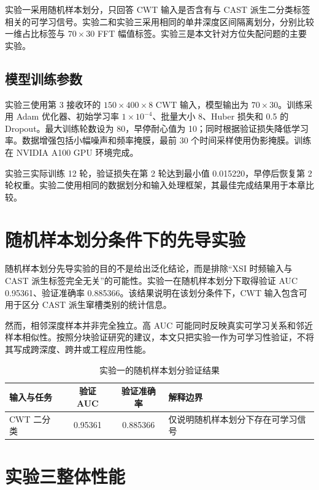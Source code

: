 实验一采用随机样本划分，只回答 CWT 输入是否含有与 CAST 派生二分类标签相关的可学习信号。实验二和实验三采用相同的单井深度区间隔离划分，分别比较一维占比标签与 $70\times30$ FFT 幅值标签。实验三是本文针对方位失配问题的主要实验。

\subsection{模型训练参数}

实验三使用第 3 接收环的 $150\times400\times8$ CWT 输入，模型输出为 $70\times30$。训练采用 Adam 优化器、初始学习率 $1\times10^{-4}$、批量大小 8、Huber 损失和 0.5 的 Dropout。最大训练轮数设为 80，早停耐心值为 10；同时根据验证损失降低学习率。数据增强包括小幅噪声和频率掩膜，最前 30 个时间采样使用伪影掩膜。训练在 NVIDIA A100 GPU 环境完成。

实验三实际训练 12 轮，验证损失在第 2 轮达到最小值 0.015220，早停后恢复第 2 轮权重。实验二使用相同的数据划分和输入处理框架，其最佳完成结果用于本章比较。

\section{随机样本划分条件下的先导实验}

随机样本划分先导实验的目的不是给出泛化结论，而是排除“XSI 时频输入与 CAST 派生标签完全无关”的可能性。实验一在随机样本划分下取得验证 AUC 0.95361、验证准确率 0.885366。该结果说明在该划分条件下，CWT 输入包含可用于区分 CAST 派生窜槽类别的统计信息。

然而，相邻深度样本并非完全独立。高 AUC 可能同时反映真实可学习关系和邻近样本相似性。按照分块验证研究的建议\cite{Roberts2017CrossValidation,Meyer2018TargetValidation}，本文只把实验一作为可学习性验证，不将其写成跨深度、跨井或工程应用性能。

\begin{table}[htbp]
  \centering
  \caption{实验一的随机样本划分验证结果}
  \label{tab:exp1}
  \begin{tabular}{lccp{}}
    \toprule
    输入与任务 & 验证 AUC & 验证准确率 & 解释边界 \\
    \midrule
    CWT 二分类 & 0.95361 & 0.885366 & 仅说明随机样本划分下存在可学习信号 \\
    \bottomrule
  \end{tabular}
\end{table}

\section{实验三整体性能}

